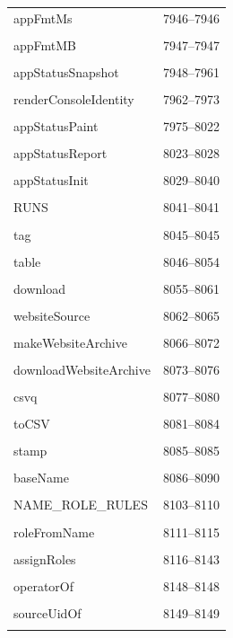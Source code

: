 {\begin{longtable}{@{}p{11cm}r@{}}
appFmtMs & 7946--7946 \\\\\hline
appFmtMB & 7947--7947 \\\\\hline
appStatusSnapshot & 7948--7961 \\\\\hline
renderConsoleIdentity & 7962--7973 \\\\\hline
appStatusPaint & 7975--8022 \\\\\hline
appStatusReport & 8023--8028 \\\\\hline
appStatusInit & 8029--8040 \\\\\hline
RUNS & 8041--8041 \\\\\hline
tag & 8045--8045 \\\\\hline
table & 8046--8054 \\\\\hline
download & 8055--8061 \\\\\hline
websiteSource & 8062--8065 \\\\\hline
makeWebsiteArchive & 8066--8072 \\\\\hline
downloadWebsiteArchive & 8073--8076 \\\\\hline
csvq & 8077--8080 \\\\\hline
toCSV & 8081--8084 \\\\\hline
stamp & 8085--8085 \\\\\hline
baseName & 8086--8090 \\\\\hline
NAME\_ROLE\_RULES & 8103--8110 \\\\\hline
roleFromName & 8111--8115 \\\\\hline
assignRoles & 8116--8143 \\\\\hline
operatorOf & 8148--8148 \\\\\hline
sourceUidOf & 8149--8149 \\\\\hline

\end{longtable}}
